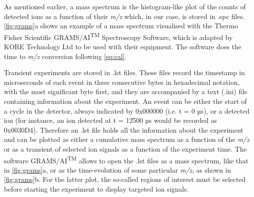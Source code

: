 As mentioned earlier, a mass spectrum is the histogram-like plot of the counts of detected ions as a function of their \textit{m/z} which, in our case, is stored in .spc files.
\autoref{fig:grams}a shows an example of a mass spectrum visualised with the Thermo Fisher Scientific\textsuperscript{\textregistered}  GRAMS/AI\textsuperscript{TM}  Spectroscopy Software, which is adapted by KORE Technology Ltd to be used with their equipment.
The software does the time to \textit{m/z} conversion following \autoref{eq:cal}.


Transient experiments are stored in %
.lst files.
 These %
 files  record the timestamp in microseconds of each event in three consecutive bytes in hexadecimal notation, with the most significant byte first, and they are accompanied by a text  (.ini) file containing information about the experiment.
An event can be either the start of a cycle in the detector, always indicated by 0x000000 (i.e. t = 0 µs), or a detected ion (for instance, an ion detected at t = 12500 µs would be recorded as 0x0030D4).
 Therefore an .lst file holds all the information about the experiment and can be plotted as either a cumulative mass spectrum as a function of the \textit{m/z} or as a transient of selected ion signals as a function of the experiment time.
The software GRAMS/AI\textsuperscript{TM} allows to open the .lst files as a mass spectrum, like that in \autoref{fig:grams}a, or as the time-evolution of some particular \textit{m/z}, as shown in \autoref{fig:grams}b. For the latter plot, the so-called regions of interest must be selected before starting the experiment 
to display targeted ion signals. 




